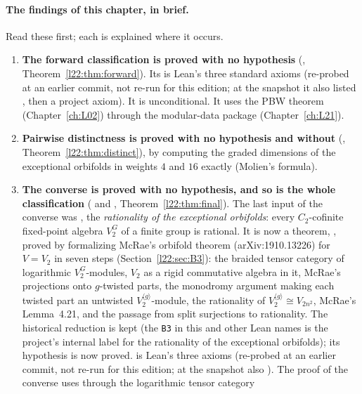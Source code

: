 \paragraph{The findings of this chapter, in brief.} Read these first; each is explained where it occurs.
\begin{enumerate}
\item \textbf{The forward classification is proved with no hypothesis}
  (, Theorem~\ref{l22:thm:forward}). Its
   is Lean's three standard axioms (re-probed at an earlier commit, not re-run for this edition; at the snapshot it also
  listed , then a project axiom). It is unconditional. It uses the PBW theorem 
  (Chapter~\ref{ch:L02}) through the modular-data package  (Chapter~\ref{ch:L21}).
\item \textbf{Pairwise distinctness is proved with no hypothesis and without} 
  (, Theorem~\ref{l22:thm:distinct}), by computing the graded dimensions
  of the exceptional orbifolds in weights $4$ and $16$ exactly (Molien's formula).
\item \textbf{The converse is proved with no hypothesis, and so is the whole classification}
  ( and , Theorem~\ref{l22:thm:final}). The last
  input of the converse was , the \emph{rationality of the exceptional orbifolds}: every $C_2$-cofinite fixed-point algebra
  $V_2^G$ of a finite group is rational. It is now a theorem, , proved by formalizing
  McRae's orbifold theorem (arXiv:1910.13226) for $V=V_2$ in seven steps (Section~\ref{l22:sec:B3}): the braided
  tensor category of logarithmic $V_2^G$-modules, $V_2$ as a rigid commutative algebra in it, McRae's projections onto
  $g$-twisted parts, the monodromy argument making each twisted part an untwisted $V_2^{\langle g\rangle}$-module, the
  rationality of $V_2^{\langle g\rangle}\cong V_{2n^2}$, McRae's Lemma~4.21, and the passage from split surjections to
  rationality. The historical reduction  is kept (the \texttt{B3} in this and other
  Lean names is the project's internal label for the rationality of the exceptional orbifolds); its hypothesis is now proved.
   is Lean's three axioms (re-probed at an earlier commit, not re-run for this edition; at the
  snapshot also ). The proof of the converse uses  through the logarithmic tensor category

\end{enumerate}
